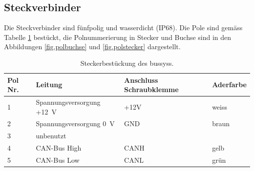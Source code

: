 \subsection{Steckverbinder}
Die Steckverbinder sind fünfpolig und wasserdicht (IP68). Die Pole sind gemäss Tabelle \ref{table.stecker} bestückt, die Polnummerierung in Stecker und Buchse sind in den Abbildungen \ref{fig.polbuchse} und \ref{fig.polstecker} dargestellt.

\begin{table}
\begin{tabular}{|l|l|l|l|}
\hline \textbf{Pol Nr.}      & \textbf{Leitung} & Anschluss Schraubklemme & Aderfarbe\\ 
\hline 1 & Spannungsversorgung +12~V & +12V & weiss \\
\hline 2 & Spannungsversorgung 0~V & GND & braun \\
\hline 3 & unbenutzt &  &  \\
\hline 4 & CAN-Bus High & CANH & gelb \\
\hline 5 & CAN-Bus Low & CANL & grün \\
\hline 
\end{tabular}
\caption{Steckerbestückung des \gls{bussys}s.}
\label{table.stecker}
\end{table}  


